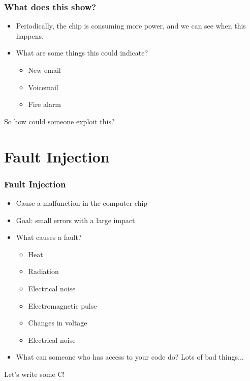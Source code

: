 \documentclass{beamer}
\begin{document}
\begin{frame}[t]
\frametitle{What does this show?}
\begin{itemize}
    \item Periodically, the chip is consuming more power, and we can see when this happens.
    \item What are some things this could indicate?
        \begin{itemize}
            \item New email
            \item Voicemail
            \item Fire alarm
        \end{itemize}
\end{itemize}
\end{frame}

\begin{frame}
    \begin{center}So how could someone exploit this?\end{center}
\end{frame}

\section{Fault Injection}

\begin{frame}[t]
\frametitle{Fault Injection}
\begin{itemize}
    \item Cause a malfunction in the computer chip
    \item Goal: small errors with a large impact
    \item What causes a fault?
        \begin{itemize}
        \item Heat
        \item Radiation
        \item Electrical noise
        \item Electromagnetic pulse
        \item Changes in voltage
        \item Electrical noise
        \end{itemize}
    \item What can someone who has access to your code do? Lots of bad things...
\end{itemize}
\end{frame}

\begin{frame}
    \begin{center}Let's write some C!\end{center}
\end{frame}
\end{document}
